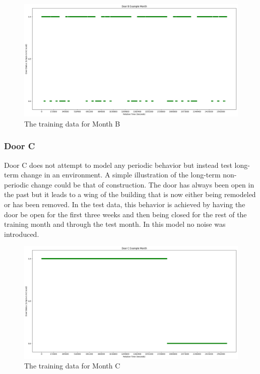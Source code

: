   \begin{figure}[!htb]
    \centering
    \includegraphics[width=\linewidth]{images/Door_B_Example_Month.png}
    \caption{The training data for Month B}
    \label{figure:Door B Training Month}
  \end{figure}

  \subsubsection{ Door C }

  Door C does not attempt to model any periodic behavior but instead test
  long-term change in an environment. A simple illustration of the long-term
  non-periodic change could be that of construction. The door has always been
  open in the past but it leads to a wing of the building that is now either
  being remodeled or has been removed. In the test data, this behavior is
  achieved by having the door be open for the first three weeks and then being
  closed for the rest of the training month and through the test month. In
  this model no noise was introduced. \\

  \begin{figure}[!htb]
    \centering
    \includegraphics[width=\linewidth]{images/Door_C_Example_Month.png}
    \caption{The training data for Month C}
    \label{figure:Door C Training Month}
  \end{figure}


